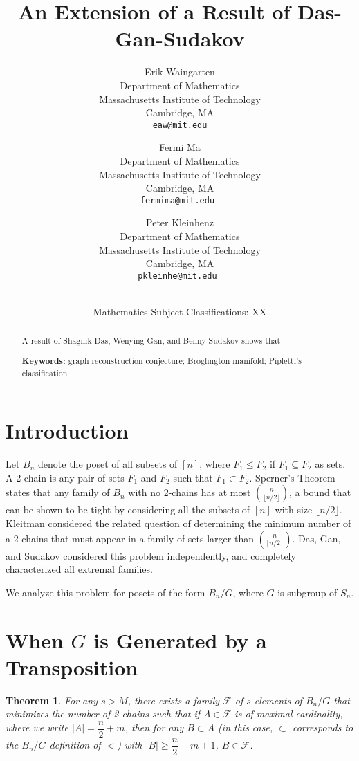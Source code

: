 \documentclass[12pt]{article}
\title{\bf An Extension of a Result of Das-Gan-Sudakov}
\author{Erik Waingarten\\
\small Department of Mathematics\\[-0.8ex]
\small Massachusetts Institute of Technology\\[-0.8ex] 
\small Cambridge, MA\\
\small\tt eaw@mit.edu\\
\and
Fermi Ma\\
\small Department of Mathematics\\[-0.8ex]
\small Massachusetts Institute of Technology\\[-0.8ex]
\small Cambridge, MA\\
\small\tt fermima@mit.edu
\and
Peter Kleinhenz\\
\small Department of Mathematics\\[-0.8ex]
\small Massachusetts Institute of Technology\\[-0.8ex]
\small Cambridge, MA\\
\small\tt pkleinhe@mit.edu
}
\date{\dateline{August 1, 2014}{XX}\\
\small Mathematics Subject Classifications: XX}
\theoremstyle{plain}
\newtheorem{theorem}{Theorem}
\theoremstyle{definition}
\theoremstyle{remark}
\newcommand{\F}{\mathcal{F}}
\begin{document}
\maketitle


\begin{abstract}
  A result of Shagnik Das, Wenying Gan, and Benny Sudakov shows that

  \bigskip\noindent \textbf{Keywords:} graph reconstruction
  conjecture; Broglington manifold; Pipletti's classification
\end{abstract}

\section{Introduction}

Let $B_n$ denote the poset of all subsets of $[n]$, where $F_1 \leq F_2$ if $F_1 \subseteq F_2$ as sets. A 2-chain is any pair of sets $F_1$ and $F_2$ such that $F_1 \subset F_2$. Sperner's Theorem states that any family of $B_n$ with no 2-chains has at most $\binom{n}{\lfloor n/2 \rfloor}$, a bound that can be shown to be tight by considering all the subsets of $[n]$ with size $\lfloor n/2 \rfloor$. Kleitman considered the related question of determining the minimum number of a 2-chains that must appear in a family of sets larger than $\binom{n}{\lfloor n/2 \rfloor}$. Das, Gan, and Sudakov considered this problem independently, and completely characterized all extremal families.

We analyze this problem for posets of the form $B_n / G$, where $G$ is subgroup of $S_n$.

\section{When $G$ is Generated by a Transposition}
\begin{theorem} For any $s > M$, there exists a family $\F$ of $s$ elements of $B_n/G$ that minimizes the number of 2-chains such that if $A \in \F$ is of maximal cardinality, where we write $|A| = \dfrac{n}{2} + m$, then for any $B \subset A$ (in this case, $\subset$ corresponds to the $B_n/G$ definition of $<$) with $|B| \geq \dfrac{n}{2} - m + 1$, $B \in \F$.
\end{theorem}
\end{document}
